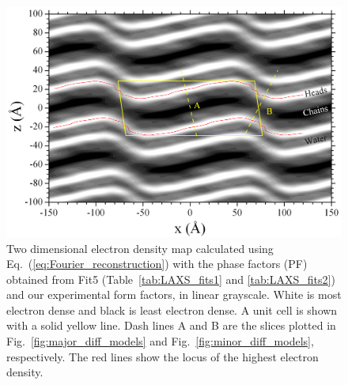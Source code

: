 \begin{landscape}
\begin{figure}[htbp]
  \centering
  \includegraphics[width=0.85\linewidth]{figures/ripple/LAXS/Fit5_2D_edp}
  \caption[Two dimensional electron density map calculated using 
  Eq.~(\ref{eq:Fourier_reconstruction}) with the phase factors (PF) obtained 
  from Fit5 (Table~\ref{tab:LAXS_fits1} and \ref{tab:LAXS_fits2}) and our 
  experimental form factors, in linear grayscale]
  {Two dimensional electron density map calculated using 
  Eq.~(\ref{eq:Fourier_reconstruction}) with the phase factors (PF) obtained 
  from Fit5 (Table~\ref{tab:LAXS_fits1} and \ref{tab:LAXS_fits2}) and our 
  experimental form factors, in linear grayscale. 
  White is most electron dense and black is least electron dense. 
  A unit cell is shown with a solid yellow line. 
  Dash lines A and B are the slices plotted in  Fig.~\ref{fig:major_diff_models} 
  and Fig.~\ref{fig:minor_diff_models}, respectively.
  The red lines show the locus of the highest electron density.}
  \label{fig:Fit5_2D_edp}
\end{figure}
\end{landscape}


